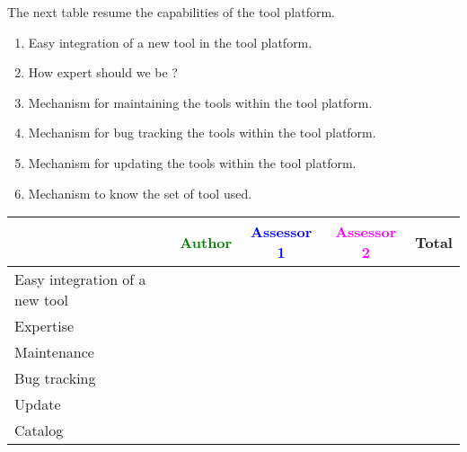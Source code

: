 The next table resume the capabilities of the tool platform.
\begin{enumerate}
\item Easy integration of a new tool in the tool platform.
\item How expert should we be ?
\item Mechanism for maintaining the tools within the tool platform.
\item Mechanism for bug tracking the tools within the tool platform.
\item Mechanism for updating the tools within the tool platform.
\item Mechanism to know the set of tool used.
\end{enumerate}

\begin{tabular}{|l | c | c | c | c|}
\hline
& \textcolor{green}{Author} & \textcolor{blue}{Assessor 1} & \textcolor{magenta}{Assessor 2} & Total \\
\hline Easy integration of a new tool &
  &                 &                  &\\
\hline Expertise &
  &                 &                  &\\
\hline Maintenance &
  &                 &                  &\\
\hline Bug tracking &
  &                 &                  &\\
\hline Update &
  &                 &                  &\\
\hline  Catalog &
  &                 &                  &\\
\hline
\end{tabular}


